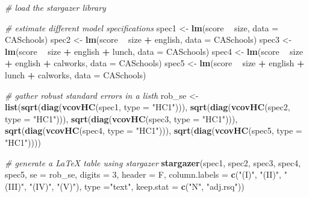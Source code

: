 \documentclass[]{book}
\newenvironment{Shaded}{\begin{snugshade}}{\end{snugshade}}
\newcommand{\KeywordTok}[1]{\textcolor[rgb]{0.13,0.29,0.53}{\textbf{#1}}}
\newcommand{\DataTypeTok}[1]{\textcolor[rgb]{0.13,0.29,0.53}{#1}}
\newcommand{\DecValTok}[1]{\textcolor[rgb]{0.00,0.00,0.81}{#1}}
\newcommand{\StringTok}[1]{\textcolor[rgb]{0.31,0.60,0.02}{#1}}
\newcommand{\CommentTok}[1]{\textcolor[rgb]{0.56,0.35,0.01}{\textit{#1}}}
\newcommand{\OperatorTok}[1]{\textcolor[rgb]{0.81,0.36,0.00}{\textbf{#1}}}
\newcommand{\NormalTok}[1]{#1}
\begin{document}
\begin{Shaded}
\begin{Highlighting}[]
\CommentTok{# load the stargazer library}

\CommentTok{# estimate different model specifications}
\NormalTok{spec1 <-}\StringTok{ }\KeywordTok{lm}\NormalTok{(score }\OperatorTok{~}\StringTok{ }\NormalTok{size, }\DataTypeTok{data =}\NormalTok{ CASchools)}
\NormalTok{spec2 <-}\StringTok{ }\KeywordTok{lm}\NormalTok{(score }\OperatorTok{~}\StringTok{ }\NormalTok{size }\OperatorTok{+}\StringTok{ }\NormalTok{english, }\DataTypeTok{data =}\NormalTok{ CASchools)}
\NormalTok{spec3 <-}\StringTok{ }\KeywordTok{lm}\NormalTok{(score }\OperatorTok{~}\StringTok{ }\NormalTok{size }\OperatorTok{+}\StringTok{ }\NormalTok{english }\OperatorTok{+}\StringTok{ }\NormalTok{lunch, }\DataTypeTok{data =}\NormalTok{ CASchools)}
\NormalTok{spec4 <-}\StringTok{ }\KeywordTok{lm}\NormalTok{(score }\OperatorTok{~}\StringTok{ }\NormalTok{size }\OperatorTok{+}\StringTok{ }\NormalTok{english }\OperatorTok{+}\StringTok{ }\NormalTok{calworks, }\DataTypeTok{data =}\NormalTok{ CASchools)}
\NormalTok{spec5 <-}\StringTok{ }\KeywordTok{lm}\NormalTok{(score }\OperatorTok{~}\StringTok{ }\NormalTok{size }\OperatorTok{+}\StringTok{ }\NormalTok{english }\OperatorTok{+}\StringTok{ }\NormalTok{lunch }\OperatorTok{+}\StringTok{ }\NormalTok{calworks, }\DataTypeTok{data =}\NormalTok{ CASchools)}

\CommentTok{# gather robust standard errors in a listh}
\NormalTok{rob_se <-}\StringTok{ }\KeywordTok{list}\NormalTok{(}\KeywordTok{sqrt}\NormalTok{(}\KeywordTok{diag}\NormalTok{(}\KeywordTok{vcovHC}\NormalTok{(spec1, }\DataTypeTok{type =} \StringTok{"HC1"}\NormalTok{))),}
               \KeywordTok{sqrt}\NormalTok{(}\KeywordTok{diag}\NormalTok{(}\KeywordTok{vcovHC}\NormalTok{(spec2, }\DataTypeTok{type =} \StringTok{"HC1"}\NormalTok{))),}
               \KeywordTok{sqrt}\NormalTok{(}\KeywordTok{diag}\NormalTok{(}\KeywordTok{vcovHC}\NormalTok{(spec3, }\DataTypeTok{type =} \StringTok{"HC1"}\NormalTok{))),}
               \KeywordTok{sqrt}\NormalTok{(}\KeywordTok{diag}\NormalTok{(}\KeywordTok{vcovHC}\NormalTok{(spec4, }\DataTypeTok{type =} \StringTok{"HC1"}\NormalTok{))),}
               \KeywordTok{sqrt}\NormalTok{(}\KeywordTok{diag}\NormalTok{(}\KeywordTok{vcovHC}\NormalTok{(spec5, }\DataTypeTok{type =} \StringTok{"HC1"}\NormalTok{))))}

\CommentTok{# generate a LaTeX table using stargazer}
\KeywordTok{stargazer}\NormalTok{(spec1, spec2, spec3, spec4, spec5,}
          \DataTypeTok{se =}\NormalTok{ rob_se,}
          \DataTypeTok{digits =} \DecValTok{3}\NormalTok{,}
          \DataTypeTok{header =}\NormalTok{ F,}
          \DataTypeTok{column.labels =} \KeywordTok{c}\NormalTok{(}\StringTok{"(I)"}\NormalTok{, }\StringTok{"(II)"}\NormalTok{, }\StringTok{"(III)"}\NormalTok{, }\StringTok{"(IV)"}\NormalTok{, }\StringTok{"(V)"}\NormalTok{),}
          \DataTypeTok{type =}\StringTok{"text"}\NormalTok{, }
          \DataTypeTok{keep.stat =} \KeywordTok{c}\NormalTok{(}\StringTok{"N"}\NormalTok{, }\StringTok{"adj.rsq"}\NormalTok{))}
\end{Highlighting}
\end{Shaded}
\end{document}
